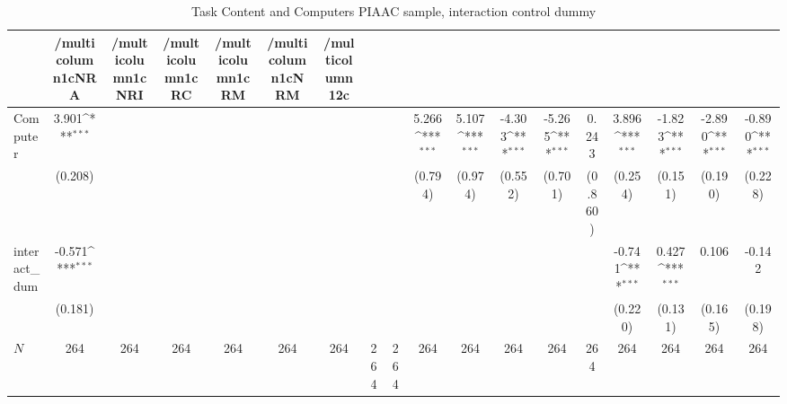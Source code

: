 \begin{table}[htbp]\centering
\def\sym#1{\ifmmode^{#1}\else\(^{#1}\)\fi}
\caption{Task Content and Computers PIAAC sample, interaction control dummy}
\begin{tabular}{l*{17}{c}}
\hline\hline
            &/multicolumn{1}{c}{NRA}&/multicolumn{1}{c}{NRI}&/multicolumn{1}{c}{RC}&/multicolumn{1}{c}{RM}&/multicolumn{1}{c}{NRM}&/multicolumn{12}{c}{}                                                                                                                                                                                                                                                  \\
\hline
Computer    &       3.901\sym{***}&                     &                     &                     &                     &                     &                     &                     &       5.266\sym{***}&       5.107\sym{***}&      -4.303\sym{***}&      -5.265\sym{***}&       0.243         &       3.896\sym{***}&      -1.823\sym{***}&      -2.890\sym{***}&      -0.890\sym{***}\\
            &     (0.208)         &                     &                     &                     &                     &                     &                     &                     &     (0.794)         &     (0.974)         &     (0.552)         &     (0.701)         &     (0.860)         &     (0.254)         &     (0.151)         &     (0.190)         &     (0.228)         \\
[1em]
interact\_dum&      -0.571\sym{***}&                     &                     &                     &                     &                     &                     &                     &                     &                     &                     &                     &                     &      -0.741\sym{***}&       0.427\sym{***}&       0.106         &      -0.142         \\
            &     (0.181)         &                     &                     &                     &                     &                     &                     &                     &                     &                     &                     &                     &                     &     (0.220)         &     (0.131)         &     (0.165)         &     (0.198)         \\
\hline
\(N\)       &         264         &         264         &         264         &         264         &         264         &         264         &         264         &         264         &         264         &         264         &         264         &         264         &         264         &         264         &         264         &         264         &         264         \\

\end{tabular}
\end{table}
